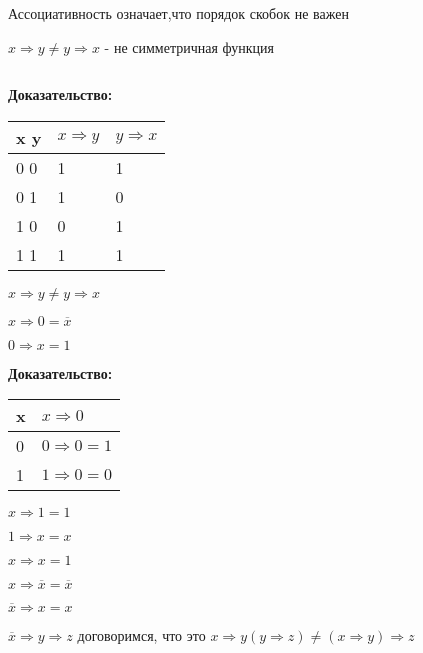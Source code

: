 \documentclass[russian]{lecture-notes}
\begin{document}
\begin{sloppypar}
\begin{proposition}
    Ассоциативность означает,что порядок скобок не важен 
    
    \begin{example} $x \Rightarrow y \neq y \Rightarrow x$ - не симметричная функция
    
    $$$$
    
        \textbf{Доказательство: }
        
    \begin{table}[h!]
        \centering	
        \begin{tabular}{|l|l|l|}
            \hline
            x y & $x \Rightarrow y$ & $y \Rightarrow x$ \\ \hline
            0 0 & 1 & 1 \\ \hline
            0 1 & 1 & 0 \\ \hline
            1 0 & 0 & 1 \\ \hline
            1 1 & 1 & 1 \\ \hline
        \end{tabular}
    \end{table}
    
    \end{example}
    
    \begin{remark}
        $x \Rightarrow y \neq y\Rightarrow x$
    \end{remark}
        
$x \Rightarrow 0 = \overline{x}$

$0 \Rightarrow x = 1$
 $$$$

\textbf{Доказательство: }

\begin{table}[h!]
\centering
\begin{tabular}{|l|l|}
\hline
x & $x \Rightarrow 0$ \\ \hline
0 & $0 \Rightarrow 0 = 1$ \\ \hline
1 & $1 \Rightarrow 0 = 0$ \\ \hline
\end{tabular}
\end{table}

$x\Rightarrow 1 = 1$

$1 \Rightarrow x = x$

$x \Rightarrow x = 1$

$x \Rightarrow \overline{x} = \overline{x}$

$\overline{x} \Rightarrow x = x$

$\overline{x} \Rightarrow y \Rightarrow z$ договоримся, что это $x \Rightarrow y (y\Rightarrow z) \neq (x \Rightarrow y) \Rightarrow z$


\end{proposition}
\end{sloppypar}
\end{document}
